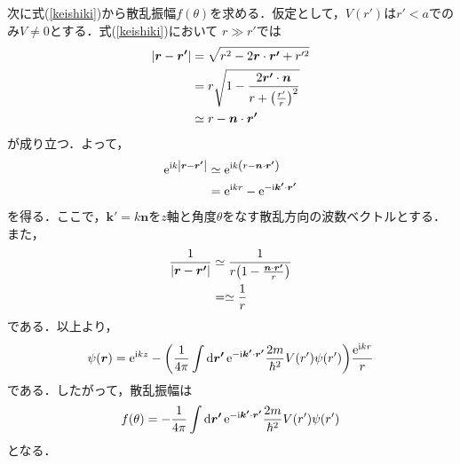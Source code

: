 \documentclass{report}
\begin{document}
    次に式(\ref{keishiki})から散乱振幅$f(\theta)$を求める．仮定として，$V(r')$は$r'<a$でのみ$V\neq 0$とする．式(\ref{keishiki})において
    $r  \gg r'$では
    \begin{align}
      \abs{\bm{r} - \bm{r'}} &= \sqrt{r^2 - 2\bm{r} \cdot \bm{r'} + r'^2}\\
      &= r \sqrt{1 - \frac{2\bm{r'} \cdot \bm{n}}{r + \qty(\frac{r'}{r})^2}}\\
      &\simeq r - \bm{n}\cdot\bm{r'}
    \end{align}
    が成り立つ．よって，
    \begin{align}
      \mathrm{e}^{\mathrm{i} k \abs{\bm{r} - \bm{r'}}} &\simeq \mathrm{e}^{\mathrm{i} k \qty(r - \bm{n} \cdot \bm{r'})}\\
      &= \mathrm{e}^{\mathrm{i} k r} - \mathrm{e}^{-\mathrm{i} \bm{k'} \cdot \bm{r'}}
    \end{align}
    を得る．ここで，$\bm{k'} = k \bm{n}$を$z$軸と角度$\theta$をなす散乱方向の波数ベクトルとする．また，
    \begin{align}
      \frac{1}{\abs{\bm{r} - \bm{r'}}} &\simeq \frac{1}{r\qty(1 - \frac{\bm{n}\cdot\bm{r'}}{r})}\\
      &= \simeq \frac{1}{r}
    \end{align}
    である．以上より，
    \begin{align}
      \psi(\bm{r}) = \mathrm{e}^{\mathrm{i} kz} - \qty(\frac{1}{4\pi} \int \dd{\bm{r'}} \mathrm{e}^{- \mathrm{i} \bm{k'} \cdot \bm{r'}} \frac{2m}{\hbar^2}V(r')\psi(r'))\frac{\mathrm{e}^{\mathrm{i} kr}}{r}
    \end{align}
    である．したがって，散乱振幅は
    \begin{align}
      f(\theta) = -\frac{1}{4\pi} \int \dd{\bm{r'}} \mathrm{e}^{- \mathrm{i} \bm{k'} \cdot \bm{r'}} \frac{2m}{\hbar^2}V(r')\psi(r')
    \end{align}
    となる．
\end{document}
